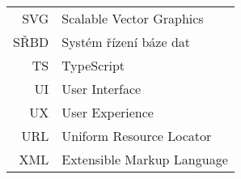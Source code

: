\begin{longtable}{rl}
SVG & Scalable Vector Graphics\\
SŘBD & Systém řízení báze dat\\
TS & TypeScript\\
UI & User Interface\\
UX & User Experience\\
URL & Uniform Resource Locator\\
XML & Extensible Markup Language\\
\end{longtable}